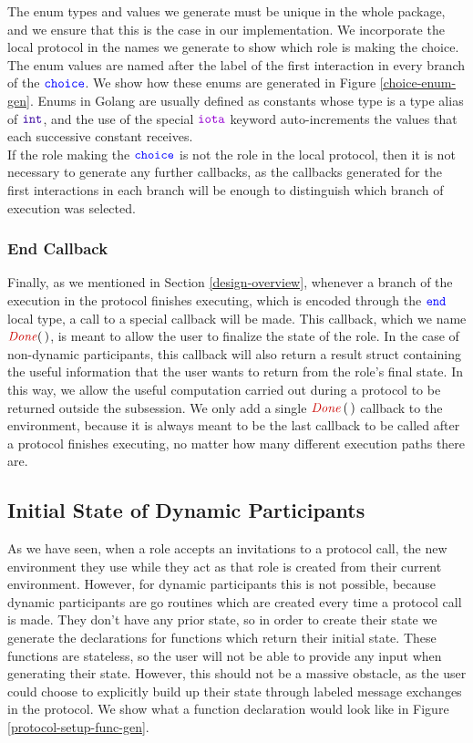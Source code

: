 \documentclass[12pt,twoside]{report}
\begin{document}
The enum types and values we generate must be unique in the whole package, and we ensure that this is the case in our implementation. We incorporate the local protocol in the names we generate to show which role is making the choice. The enum values are named after the label of the first interaction in every branch of the ${\color{blue}\mathtt{choice}}$. We show how these enums are generated in Figure \ref{choice-enum-gen}. Enums in Golang are usually defined as constants whose type is a type alias of $\typename{int}$, and the use of the special $\goiota$ keyword auto-increments the values that each successive constant receives.\\

If the role making the ${\color{blue}\mathtt{choice}}$ is not the role in the local protocol, then it is not necessary to generate any further callbacks, as the callbacks generated for the first interactions in each branch will be enough to distinguish which branch of execution was selected.

\subsubsection{End Callback}
Finally, as we mentioned in Section \ref{design-overview}, whenever a branch of the execution in the protocol finishes executing, which is encoded through the ${\color{blue}\mathtt{end}}$ local type, a call to a special callback will be made. This callback, which we name $\functionname{Done}(\,)$, is meant to allow the user to finalize the state of the role. In the case of non-dynamic participants, this callback will also return a result struct containing the useful information that the user wants to return from the role's final state. In this way, we allow the useful computation carried out during a protocol to be returned outside the subsession. We only add a single $\functionname{Done}\,(\,)$ callback to the environment, because it is always meant to be the last callback to be called after a protocol finishes executing, no matter how many different execution paths there are.\\

\subsection{Initial State of Dynamic Participants}
As we have seen, when a role accepts an invitations to a protocol call, the new environment they use while they act as that role is created from their current environment. However, for dynamic participants this is not possible, because dynamic participants are go routines which are created every time a protocol call is made. They don't have any prior state, so in order to create their state we generate the declarations for functions which return their initial state. These functions are stateless, so the user will not be able to provide any input when generating their state. However, this should not be a massive obstacle, as the user could choose to explicitly build up their state through labeled message exchanges in the protocol. We show what a function declaration would look like in Figure \ref{protocol-setup-func-gen}.
\\
\end{document}
